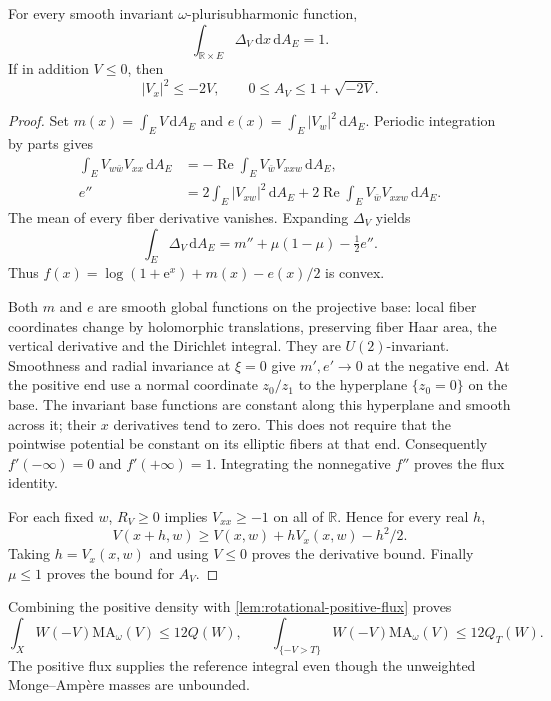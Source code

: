 \begin{lemma}\label{lem:rotational-positive-flux}
For every smooth invariant $\omega$-plurisubharmonic function,
\[
 \int_{\mathbb R\times E}\Delta_V\,\mathrm dx\,\mathrm dA_E=1.
\]
If in addition $V\leq0$, then
\[
 |V_x|^2\leq-2V,\qquad 0\leq A_V\leq1+\sqrt{-2V}.
\]
\end{lemma}
\begin{proof}
Set $m(x)=\int_EV\,\mathrm dA_E$ and
$e(x)=\int_E|V_w|^2\,\mathrm dA_E$.
Periodic integration by parts gives
\[
 \begin{split}
 \int_E V_{w\bar w}V_{xx}\,\mathrm dA_E
    &=-\operatorname{Re}\int_EV_{\bar w}V_{xxw}\,\mathrm dA_E,\\
 e''&=2\int_E|V_{xw}|^2\,\mathrm dA_E
       +2\operatorname{Re}\int_EV_{\bar w}V_{xxw}\,\mathrm dA_E.
 \end{split}
\]
The mean of every fiber derivative vanishes. Expanding $\Delta_V$ yields
\[
 \int_E\Delta_V\,\mathrm dA_E
   =m''+\mu(1-\mu)-\tfrac12e''.
\]
Thus $f(x)=\log(1+\mathrm e^x)+m(x)-e(x)/2$ is convex.

Both $m$ and $e$ are smooth global functions on the projective base:
local fiber coordinates change by holomorphic translations, preserving
fiber Haar area, the vertical derivative and the Dirichlet integral.
They are $U(2)$-invariant. Smoothness and radial invariance at $\xi=0$
give $m',e'\to0$ at the negative end. At the positive end use a normal
coordinate $z_0/z_1$ to the hyperplane $\{z_0=0\}$ on the base.
The invariant base functions are constant along this hyperplane and
smooth across it; their $x$ derivatives tend to zero. This does not
require that the pointwise potential be constant on its elliptic fibers
at that end. Consequently $f'(-\infty)=0$ and $f'(+\infty)=1$.
Integrating the nonnegative $f''$ proves the flux identity.

For each fixed $w$, $R_V\geq0$ implies $V_{xx}\geq-1$ on all of $\mathbb R$.
Hence for every real $h$,
\[
 V(x+h,w)\geq V(x,w)+hV_x(x,w)-h^2/2.
\]
Taking $h=V_x(x,w)$ and using $V\leq0$ proves the derivative bound.
Finally $\mu\leq1$ proves the bound for $A_V$.
\end{proof}

Combining the positive density with \cref{lem:rotational-positive-flux} proves
\begin{equation}\label{eq:rotational-smooth-upper}
 \int_XW(-V)\mathrm{MA}_\omega(V)\leq12Q(W),\qquad
 \int_{\{-V>T\}}W(-V)\mathrm{MA}_\omega(V)\leq12Q_T(W).
\end{equation}
The positive flux supplies the reference integral even though the unweighted Monge--Amp\`ere masses are unbounded.

